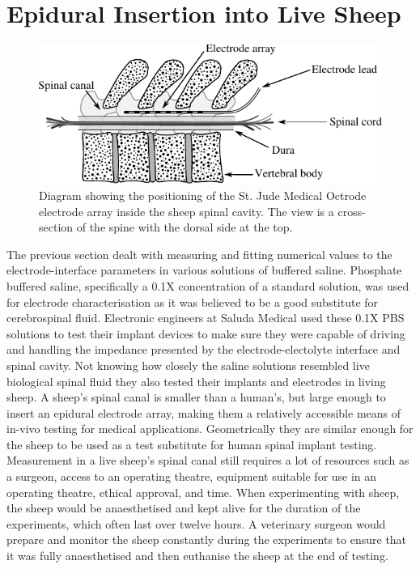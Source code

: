 
\section{Epidural Insertion into Live Sheep}
  \label{sect:sheep_measurements}


  \begin{figure}
    \centering
    \includegraphics{content/pt2/08-InterfaceParameters/graphics/sheepSpine}
    \caption{\label{fig:sheepSpine} Diagram showing the positioning of the St. Jude Medical Octrode electrode array inside the sheep spinal cavity. The view is a cross-section of the spine with the dorsal side at the top.}
  \end{figure}

  The previous section dealt with measuring and fitting numerical values to the electrode-interface parameters in various solutions of buffered saline.
  Phosphate buffered saline, specifically a 0.1X concentration of a standard solution, was used for electrode characterisation as it was believed to be a good substitute for cerebrospinal fluid.
  Electronic engineers at Saluda Medical used these 0.1X PBS solutions to test their implant devices to make sure they were capable of driving and handling the impedance presented by the electrode-electolyte interface and spinal cavity.
  Not knowing how closely the saline solutions resembled live biological spinal fluid they also tested their implants and electrodes in living sheep.
  A sheep's spinal canal is smaller than a human's, but large enough to insert an epidural electrode array, making them a relatively accessible means of in-vivo testing for medical applications.
  Geometrically they are similar enough for the sheep to be used as a test substitute for human spinal implant testing.
  Measurement in a live sheep's spinal canal still requires a lot of resources such as a surgeon, access to an operating theatre, equipment suitable for use in an operating theatre, ethical approval, and time.
  When experimenting with sheep, the sheep would be anaesthetised and kept alive for the duration of the experiments, which often last over twelve hours.
  A veterinary surgeon would prepare and monitor the sheep constantly during the experiments to ensure that it was fully anaesthetised and then euthanise the sheep at the end of testing.

